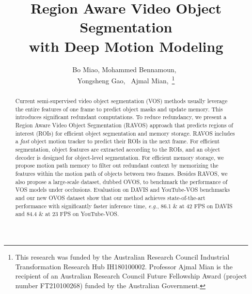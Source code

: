 \documentclass[journal]{IEEEtran}
\def\eg{\emph{e.g.}}
\begin{document}
\title{Region Aware Video Object Segmentation\\ with Deep Motion Modeling}


\author{Bo Miao, 
Mohammed Bennamoun,~\\
Yongsheng Gao,~ 
Ajmal Mian,~\thanks{This research was funded by the Australian Research Council Industrial Transformation Research Hub IH180100002. Professor Ajmal Mian is the recipient of an Australian Research Council Future Fellowship Award (project number FT210100268) funded by the Australian Government.}
}














\maketitle

\begin{abstract}
Current semi-supervised video object segmentation (VOS) methods usually leverage the entire features of one frame to predict object masks and update memory. This introduces significant redundant computations. To reduce redundancy, we present a Region Aware Video Object Segmentation (RAVOS) approach that predicts regions of interest (ROIs) for efficient object segmentation and memory storage. RAVOS includes a \emph{fast} object motion tracker to predict their ROIs in the next frame. For efficient segmentation, object features are extracted according to the ROIs, and an object decoder is designed for object-level segmentation. For efficient memory storage, we propose motion path memory to filter out redundant context by memorizing the features within the motion path of objects between two frames. Besides RAVOS, we also propose a large-scale dataset, dubbed OVOS, to benchmark the performance of VOS models under occlusions. Evaluation on DAVIS and YouTube-VOS benchmarks and our new OVOS dataset show that our method achieves state-of-the-art performance with significantly faster inference time, \eg, 86.1 \& at 42 FPS on DAVIS and 84.4 \& at 23 FPS on YouTube-VOS.
\end{abstract}
\end{document}
